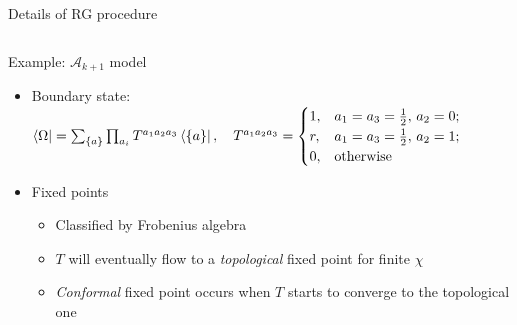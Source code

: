\documentclass{fdubeamer}
\begin{document}
\begin{frame}{Details of RG procedure}
\begin{columns}[c]
\end{columns}


\end{frame}

\begin{frame}{Example: \texorpdfstring{$\mathcal{A}_{k+1}$}{𝒜ₖ₊₁} model}

\begin{itemize}
  \item Boundary state: \\
    \begingroup
      \scriptsize
      \mbox{\qquad}
      $
        \bra{\Omega} = \sum_{\{a\}} \prod_{a_i} T^{a_1 a_2 a_3} \bra{\{a\}}, \quad 
        T^{a_1 a_2 a_3} = \begin{cases}
          1, & a_1 = a_3 = \frac12, \, a_2 = 0; \\
          r, & a_1 = a_3 = \frac12, \, a_2 = 1; \\
          0, & \mathrm{otherwise}
        \end{cases}
      $
    \endgroup

  \item Fixed points

    \begin{itemize}
      \item Classified by Frobenius algebra
      \item $T$ will eventually flow to a \emph{topological} fixed point for finite $\chi$
      \item \emph{Conformal} fixed point occurs when $T$ starts to converge to the topological one
    \end{itemize}
\end{itemize}

\end{frame}
\end{document}
